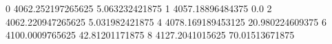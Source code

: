 0 4062.252197265625 5.063232421875
1 4057.18896484375 0.0
2 4062.220947265625 5.031982421875
4 4078.169189453125 20.980224609375
6 4100.0009765625 42.81201171875
8 4127.2041015625 70.01513671875
